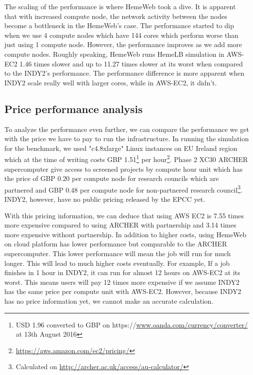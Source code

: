 \vspace{0.5cm}

The scaling of the performance is where HemeWeb took a dive. It is apparent that with increased compute node, the network activity between the nodes become a bottleneck in the HemeWeb's case. The performance started to dip when we use 4 compute nodes which have 144 cores which perform worse than just using 1 compute node. However, the performance improves as we add more compute nodes. Roughly speaking, HemeWeb runs HemeLB simulation in AWS-EC2 1.46 times slower and up to 11.27 times slower at its worst when compared to the INDY2's performance. The performance difference is more apparent when INDY2 scale really well with larger cores, while in AWS-EC2, it didn't.

\subsection{Price performance analysis}

To analyze the performance even further, we can compare the performance we get with the price we have to pay to run the infrastructure. In running the simulation for the benchmark, we used "c4.8xlarge" Linux instances on EU Ireland region which at the time of writing costs GBP 1.51\footnote{USD 1.96 converted to GBP on https://\url{www.oanda.com/currency/converter/} at 13th August 2016} per hour\footnote{\url{https://aws.amazon.com/ec2/pricing/}}. Phase 2 XC30 ARCHER supercomputer give access to screened projects by compute hour unit which has the price of GBP 0.20 per compute node for research councils which are partnered and GBP 0.48 per compute node for non-partnered research council\footnote{Calculated on \url{http://archer.ac.uk/access/au-calculator/}}. INDY2, however, have no public pricing released by the EPCC yet.

With this pricing information, we can deduce that using AWS EC2 is 7.55 times more expensive compared to using ARCHER with partnership and 3.14 times more expensive without partnership. In addition to higher costs, using HemeWeb on cloud platform has lower performance but comparable to the ARCHER supercomputer. This lower performance will mean the job will run for much longer. This will lead to much higher costs eventually. For example, If a job finishes in 1 hour in INDY2, it can run for almost 12 hours on AWS-EC2 at its worst. This means users will pay 12 times more expensive if we assume INDY2 has the same price per compute unit with AWS-EC2. However, because INDY2 has no price information yet, we cannot make an accurate calculation.

